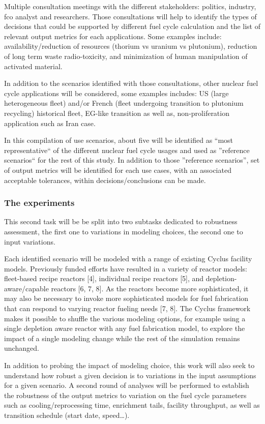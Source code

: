 Multiple consultation meetings with the different stakeholders: politics,
industry, fco analyst and researchers. Those consultations will help to identify
the types of decisions that could be supported by different fuel cycle
calculation and the list of relevant output metrics for each applications. 
Some examples include: availability/reduction of resources (thorium vs uranium
vs plutonium), reduction of long term waste radio-toxicity, and minimization of
human manipulation of activated material.

In addition to the scenarios identified with those consultations, other nuclear
fuel cycle applications will be considered, some examples includes: US (large
heterogeneous fleet) and/or French (fleet undergoing transition to plutonium
recycling) historical fleet, EG-like transition as well as, non-proliferation
application such as Iran case.

In this compilation of use scenarios, about five will be identified as ``most
representative`` of the different nuclear fuel cycle usages and used as
''reference scenarios`` for the rest of this study. In addition to those
''reference scenarios'', set of output metrics will be identified for each use
cases, with an associated acceptable tolerances, within decisions/conclusions
can be made.


\subsubsection{The experiments}

This second task will be be split into two subtasks dedicated to robustness
assessment, the first one to variations in modeling choices, the second one to
input variations.  

Each identified scenario will be modeled with a range of existing Cyclus
facility models.  Previously funded efforts have resulted in a variety of
reactor models: fleet-based recipe reactors [4], individual recipe reactors [5],
and depletion-aware/capable reactors [6, 7, 8].  As the reactors become more
sophisticated, it may also be necessary to invoke more sophisticated models for
fuel fabrication that can respond to varying reactor fueling needs [7, 8]. The
Cyclus framework makes it possible to shuffle the various modeling options, for
example using a single depletion aware reactor with any fuel fabrication model,
to explore the impact of a single modeling change while the rest of the
simulation remains unchanged.  

In addition to probing the impact of modeling choice, this work will also seek
to understand how robust a given decision is to variations in the input
assumptions for a given scenario.  A second round of analyses will be performed
to establish the robustness of the output metrics to variation on the fuel cycle
parameters such as cooling/reprocessing time, enrichment tails, facility
throughput, as well as transition schedule (start date, speed\dots).

